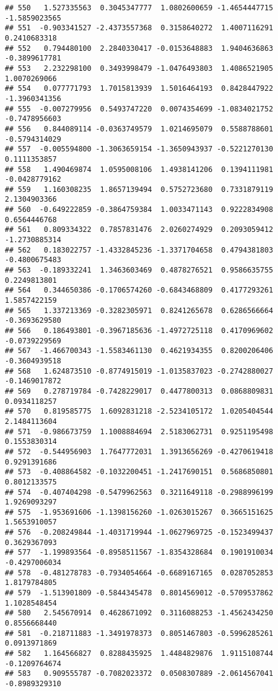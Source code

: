 \documentclass[
]{article}
\begin{document}
\begin{verbatim}
## 550   1.527335563  0.3045347777  1.0802600659 -1.4654447715 -1.5859023565
## 551  -0.903341527 -2.4373557368  0.3158640272  1.4007116291  0.2410683318
## 552   0.794480100  2.2840330417 -0.0153648883  1.9404636863 -0.3899617781
## 553   2.232298100  0.3493998479 -1.0476493803  1.4086521905  1.0070269066
## 554   0.077771793  1.7015813939  1.5016464193  0.8428447922 -1.3960341356
## 555  -0.007279956  0.5493747220  0.0074354699 -1.0834021752 -0.7478956603
## 556   0.844089114 -0.0363749579  1.0214695079  0.5588788601 -0.5794314029
## 557  -0.005594800 -1.3063659154 -1.3650943937 -0.5221270130  0.1111353857
## 558   1.490469874  1.0595008106  1.4938141206  0.1394111981 -0.0428779162
## 559   1.160308235  1.8657139494  0.5752723680  0.7331879119  2.1304903366
## 560  -0.649222859 -0.3864759384  1.0033471143  0.9222834908  0.6564446768
## 561   0.809334322  0.7857831476  2.0260274929  0.2093059412 -1.2730885314
## 562   0.183022757 -1.4332845236 -1.3371704658  0.4794381803 -0.4800675483
## 563  -0.189332241  1.3463603469  0.4878276521  0.9586635755  0.2249813801
## 564   0.344650386 -0.1706574260 -0.6843468809  0.4177293261  1.5857422159
## 565   1.337213369 -0.3282305971  0.8241265678  0.6286566664 -0.3693629580
## 566   0.186493801 -0.3967185636 -1.4972725118  0.4170969602 -0.0739229569
## 567  -1.466700343 -1.5583461130  0.4621934355  0.8200206406 -0.3604939518
## 568   1.624873510 -0.8774915019 -1.0135837023 -0.2742880027 -0.1469017872
## 569   0.278719784 -0.7428229017  0.4477800313  0.0868809831  0.0934118257
## 570   0.819585775  1.6092831218 -2.5234105172  1.0205404544  2.1484113604
## 571  -0.986673759  1.1008884694  2.5183062731  0.9251195498  0.1553830314
## 572  -0.544956903  1.7647772031  1.3913656269 -0.4270619418  0.9291391686
## 573  -0.408864582 -0.1032200451 -1.2417690151  0.5686850801  0.8012133575
## 574  -0.407404298 -0.5479962563  0.3211649118 -0.2988996199  1.9269093297
## 575  -1.953691606 -1.1398156260 -1.0263015267  0.3665151625  1.5653910057
## 576  -0.208249844 -1.4031719944 -1.0627969725 -0.1523499437  0.3629367093
## 577  -1.199893564 -0.8958511567 -1.8354328684  0.1901910034 -0.4297006034
## 578  -0.481278783 -0.7934054664 -0.6689167165  0.0287052853  1.8179784805
## 579  -1.513901809 -0.5844345478  0.8014569012 -0.5709537862  1.1028548454
## 580   2.545670914  0.4628671092  0.3116088253 -1.4562434250  0.8556668440
## 581  -0.218711883 -1.3491978373  0.8051467803 -0.5996285261  0.0913971869
## 582   1.164566827  0.8288435925  1.4484829876  1.9115108744 -0.1209764674
## 583   0.909555787 -0.7082023372  0.0508307889 -2.0614567041 -0.8989329310

\end{verbatim}
\end{document}
